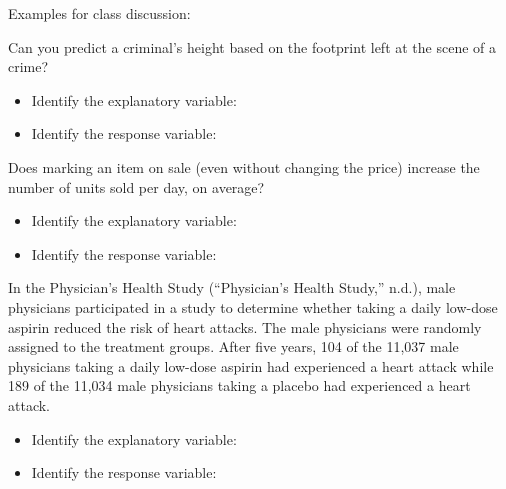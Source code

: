 \documentclass[
]{report}
\providecommand{\tightlist}{%
  \setlength{\itemsep}{0pt}\setlength{\parskip}{0pt}}
\begin{document}
Examples for class discussion:

Can you predict a criminal's height based on the footprint left at the scene of a crime?

\begin{itemize}
\tightlist
\item
  Identify the explanatory variable:
\end{itemize}

\vspace{0.25in}

\begin{itemize}
\tightlist
\item
  Identify the response variable:
\end{itemize}

\vspace{0.25in}

Does marking an item on sale (even without changing the price) increase the number of units sold per day, on average?

\begin{itemize}
\tightlist
\item
  Identify the explanatory variable:
\end{itemize}

\vspace{0.25in}

\begin{itemize}
\tightlist
\item
  Identify the response variable:
\end{itemize}

\vspace{0.25in}

In the Physician's Health Study ({``Physician's Health Study,''} n.d.), male physicians participated in a study to determine whether taking a daily low-dose aspirin reduced the risk of heart attacks. The male physicians were randomly assigned to the treatment groups. After five years, 104 of the 11,037 male physicians taking a daily low-dose aspirin had experienced a heart attack while 189 of the 11,034 male physicians taking a placebo had experienced a heart attack.

\begin{itemize}
\tightlist
\item
  Identify the explanatory variable:
\end{itemize}

\vspace{0.25in}

\begin{itemize}
\tightlist
\item
  Identify the response variable:
\end{itemize}
\end{document}
